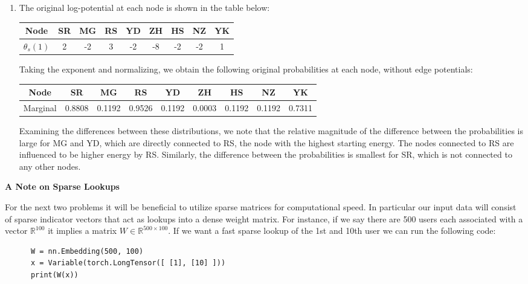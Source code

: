 \documentclass[submit]{harvardml}
\theoremstyle{plain}
\begin{document}
\begin{enumerate}[label=(\alph*)]
	\item The original log-potential at each node is shown in the table below:
	\begin{center}
		\begin{tabular}{c||cccccccc}
			Node & SR & MG & RS & YD & ZH & HS & NZ & YK \\ \hline
			$\theta_s(1)$ & 2 & -2 & 3 & -2 & -8 & -2 & -2 & 1 \\
		\end{tabular}
	\end{center}
	Taking the exponent and normalizing, we obtain the following original probabilities at each node, without edge potentials:
	\begin{center}
		\begin{tabular}{c||cccccccc}
			Node & SR & MG & RS & YD & ZH & HS & NZ & YK \\ \hline
			Marginal & 0.8808 & 0.1192 & 0.9526 & 0.1192 & 0.0003 & 0.1192 & 0.1192 & 0.7311 \\
		\end{tabular}
	\end{center}
	Examining the differences between these distributions, we note that the relative magnitude of the difference between the probabilities is large for MG and YD, which are directly connected to RS, the node with the highest starting energy. The nodes connected to RS are influenced to be higher energy by RS. Similarly, the difference between the probabilities is smallest for SR, which is not connected to any other nodes.

\end{enumerate}

\newpage

\textbf{A Note on Sparse Lookups}
\vspace{0.5cm}

\noindent For the next two problems it will be beneficial to utilize sparse
matrices for computational speed. In particular our input data will consist
of sparse indicator vectors that act as lookups into a dense weight matrix. For instance, if
we say there are 500 users each associated with a vector
$\mathbb{R}^{100}$ it implies a matrix $W \in \mathbb{R}^{500 \times
  100}$. If we want a fast sparse lookup of the 1st and 10th user we can run
the following code:


\begin{verbatim}
      W = nn.Embedding(500, 100)
      x = Variable(torch.LongTensor([ [1], [10] ]))
      print(W(x))
\end{verbatim}
\end{document}
